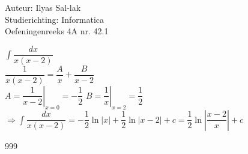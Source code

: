 \documentclass[a4paper]{article}
\newcommand{\dint}{\displaystyle\int}
\begin{document}
\noindent \large Auteur: Ilyas Sal-lak \\
\noindent \large Studierichting: Informatica\\
\noindent \large Oefeningenreeks 4A nr. 42.1\\
\medskip
\normalsize

$\dint \dfrac{dx}{x(x-2)}$ \\

$\dfrac{1}{x(x-2)} = \dfrac{A}{x} + \dfrac{B}{x-2}$ \\

$A = \left.\dfrac{1}{x-2}\right|_{x=0} = -\dfrac{1}{2}$ \quad $B = \left.\dfrac{1}{x}\right|_{x=2} = \dfrac{1}{2}$ \\

$\Rightarrow \dint \dfrac{dx}{x(x-2)} = -\dfrac{1}{2}\ln|x| + \dfrac{1}{2}\ln|x-2| + c = \dfrac{1}{2}\ln\left|\dfrac{x-2}{x}\right| + c$

\begin{thebibliography}{999}
\end{thebibliography}
\end{document}
